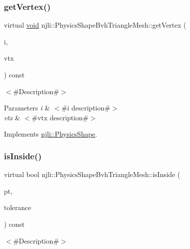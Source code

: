 \subsubsection{\texorpdfstring{get\+Vertex()}{getVertex()}}
{\footnotesize\ttfamily virtual \mbox{\hyperlink{_thread_8h_af1e856da2e658414cb2456cb6f7ebc66}{void}} njli\+::\+Physics\+Shape\+Bvh\+Triangle\+Mesh\+::get\+Vertex (\begin{DoxyParamCaption}\item[{int}]{i,  }\item[{bt\+Vector3 \&}]{vtx }\end{DoxyParamCaption}) const\hspace{0.3cm}{\ttfamily [virtual]}}

$<$\#\+Description\#$>$


\begin{DoxyParams}{Parameters}
{\em i} & $<$\#i description\#$>$ \\
\hline
{\em vtx} & $<$\#vtx description\#$>$ \\
\hline
\end{DoxyParams}


Implements \mbox{\hyperlink{classnjli_1_1_physics_shape_acb05a16bdbfa5cee6dcbab5c253eb78e}{njli\+::\+Physics\+Shape}}.

\mbox{\label{classnjli_1_1_physics_shape_bvh_triangle_mesh_a6262c423d3c1e634d3acb497d76e70d3}} 
\subsubsection{\texorpdfstring{is\+Inside()}{isInside()}}
{\footnotesize\ttfamily virtual bool njli\+::\+Physics\+Shape\+Bvh\+Triangle\+Mesh\+::is\+Inside (\begin{DoxyParamCaption}\item[{const bt\+Vector3 \&}]{pt,  }\item[{\mbox{\hyperlink{_util_8h_a5f6906312a689f27d70e9d086649d3fd}{f32}}}]{tolerance }\end{DoxyParamCaption}) const\hspace{0.3cm}{\ttfamily [virtual]}}

$<$\#\+Description\#$>$


